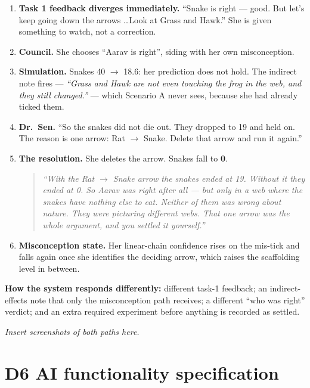 \documentclass[11pt,a4paper]{article}
\begin{document}
\begin{enumerate}[leftmargin=*,itemsep=1pt]
  \item \textbf{Task 1 feedback diverges immediately.} ``Snake is right --- good. But let's keep
        going down the arrows \ldots Look at Grass and Hawk.'' She is given something to watch,
        not a correction.
  \item \textbf{Council.} She chooses ``Aarav is right'', siding with her own misconception.
  \item \textbf{Simulation.} Snakes 40 $\rightarrow$ 18.6: her prediction does not hold. The
        indirect note fires --- \textit{``Grass and Hawk are not even touching the frog in the
        web, and they still changed.''} --- which Scenario A never sees, because she had already
        ticked them.
  \item \textbf{Dr.\ Sen.} ``So the snakes did not die out. They dropped to 19 and held on. The
        reason is one arrow: Rat $\rightarrow$ Snake. Delete that arrow and run it again.''
  \item \textbf{The resolution.} She deletes the arrow. Snakes fall to \textbf{0}.
        \begin{quote}\itshape
        ``With the Rat $\rightarrow$ Snake arrow the snakes ended at 19. Without it they ended at
        0. So Aarav was right after all --- but only in a web where the snakes have nothing else
        to eat. Neither of them was wrong about nature. They were picturing different webs. That
        one arrow was the whole argument, and you settled it yourself.''
        \end{quote}
  \item \textbf{Misconception state.} Her linear-chain confidence rises on the mis-tick and falls
        again once she identifies the deciding arrow, which raises the scaffolding level in
        between.
\end{enumerate}

\textbf{How the system responds differently:} different task-1 feedback; an indirect-effects note
that only the misconception path receives; a different ``who was right'' verdict; and an extra
required experiment before anything is recorded as settled.

\textit{Insert screenshots of both paths here.}

\section{D6 \quad AI functionality specification}
\end{document}
